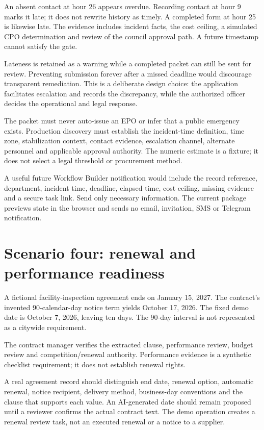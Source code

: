 \documentclass[11pt,letterpaper]{article}
\begin{document}
An absent contact at hour 26 appears overdue. Recording contact at hour 9 marks it late; it does not rewrite history as timely. A completed form at hour 25 is likewise late. The evidence includes incident facts, the cost ceiling, a simulated CPO determination and review of the council approval path. A future timestamp cannot satisfy the gate.

Lateness is retained as a warning while a completed packet can still be sent for review. Preventing submission forever after a missed deadline would discourage transparent remediation. This is a deliberate design choice: the application facilitates escalation and records the discrepancy, while the authorized officer decides the operational and legal response.

The packet must never auto-issue an EPO or infer that a public emergency exists. Production discovery must establish the incident-time definition, time zone, stabilization context, contact evidence, escalation channel, alternate personnel and applicable approval authority. The numeric estimate is a fixture; it does not select a legal threshold or procurement method.

A useful future Workflow Builder notification would include the record reference, department, incident time, deadline, elapsed time, cost ceiling, missing evidence and a secure task link. Send only necessary information. The current package previews state in the browser and sends no email, invitation, SMS or Telegram notification.

\section{Scenario four: renewal and performance readiness}
A fictional facility-inspection agreement ends on January 15, 2027. The contract's invented 90-calendar-day notice term yields October 17, 2026. The fixed demo date is October 7, 2026, leaving ten days. The 90-day interval is not represented as a citywide requirement.

The contract manager verifies the extracted clause, performance review, budget review and competition/renewal authority. Performance evidence is a synthetic checklist requirement; it does not establish renewal rights.

A real agreement record should distinguish end date, renewal option, automatic renewal, notice recipient, delivery method, business-day conventions and the clause that supports each value. An AI-generated date should remain proposed until a reviewer confirms the actual contract text. The demo operation creates a renewal review task, not an executed renewal or a notice to a supplier.
\end{document}
